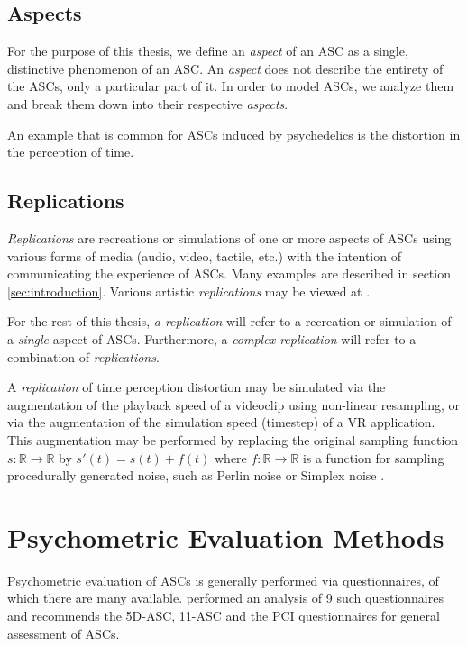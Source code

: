 \subsection{Aspects}
For the purpose of this thesis, we define an \textit{aspect} of an \ac{ASC} as a single, distinctive phenomenon of an \ac{ASC}. An \textit{aspect} does not describe the entirety of the \acp{ASC}, only a particular part of it. In order to model \acp{ASC}, we analyze them and break them down into their respective \textit{aspects}.

An example that is common for \acp{ASC} induced by psychedelics is the distortion in the perception of time.

\subsection{Replications}
\textit{Replications} are recreations or simulations of one or more aspects of \acp{ASC} using various forms of media (audio, video, tactile, etc.) with the intention of communicating the experience of \acp{ASC}. Many examples are described in section \ref{sec:introduction}. Various artistic \textit{replications} may be viewed at \textcite{pw2022replications}.

For the rest of this thesis, \textit{a replication} will refer to a recreation or simulation of a \textit{single} aspect of \acp{ASC}. Furthermore, a \textit{complex replication} will refer to a combination of \textit{replications}.

A \textit{replication} of time perception distortion may be simulated via the augmentation of the playback speed of a videoclip using non-linear resampling, or via the augmentation of the simulation speed (timestep) of a \ac{VR} application. This augmentation may be performed by replacing the original sampling function $s \colon \mathbb{R} \to \mathbb{R}$ by $s'(t) = s(t) + f(t)$ where $f \colon \mathbb{R} \to \mathbb{R}$ is a function for sampling procedurally generated noise, such as Perlin noise \autocite{perlin1985image} or Simplex noise \autocite{olano2002simplex}.

\section{Psychometric Evaluation Methods}
Psychometric evaluation of \acp{ASC} is generally performed via questionnaires, of which there are many available.
\textcites{schmidt2018empirische}{figueiredobuilding} performed an analysis of 9 such questionnaires and recommends the \acf{5D-ASC}, \acf{11-ASC} and the \ac{PCI} questionnaires for general assessment of \acp{ASC}.

